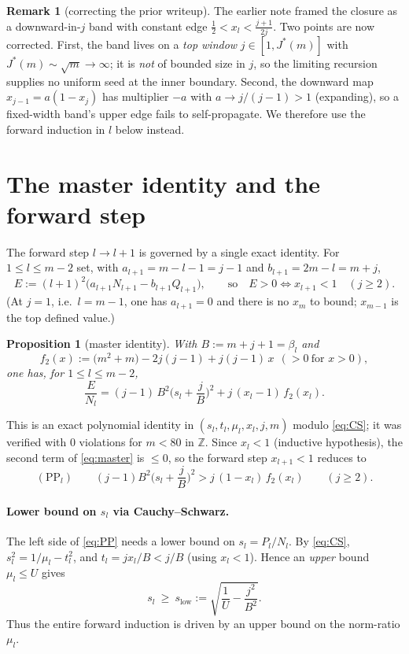 \documentclass[11pt]{article}
\newtheorem{proposition}{Proposition}
\theoremstyle{definition}
\newtheorem{remark}{Remark}
\newcommand{\Z}{\mathbb{Z}}
\begin{document}
\begin{remark}[correcting the prior writeup]
The earlier note framed the closure as a downward-in-$j$ band with
constant edge $\tfrac12<x_l<\tfrac{j+1}{2j}$.  Two points are now
corrected.  First, the band lives on a \emph{top window} $j\in[1,J^*(m)]$
with $J^*(m)\sim\sqrt m\to\infty$; it is \emph{not} of bounded size in
$j$, so the limiting recursion supplies no uniform seed at the inner
boundary.  Second, the downward map $x_{j-1}=a(1-x_j)$ has multiplier
$-a$ with $a\to j/(j-1)>1$ (expanding), so a fixed-width band's upper
edge fails to self-propagate.  We therefore use the forward induction in
$l$ below instead.
\end{remark}

\section{The master identity and the forward step}\label{sec:master}

The forward step $l\to l+1$ is governed by a single exact identity.  For
$1\le l\le m-2$ set, with $a_{l+1}=m-l-1=j-1$ and $b_{l+1}=2m-l=m+j$,
\[
  E:=(l+1)^2\big(a_{l+1}N_{l+1}-b_{l+1}Q_{l+1}\big),\qquad
  \text{so}\quad E>0\iff x_{l+1}<1\quad(j\ge2).
\]
(At $j=1$, i.e.\ $l=m-1$, one has $a_{l+1}=0$ and there is no $x_m$ to
bound; $x_{m-1}$ is the top defined value.)

\begin{proposition}[master identity]\label{prop:master}
With $B:=m+j+1=\beta_l$ and
\[
  f_2(x):=\big(m^2+m\big)-2j(j-1)+j(j-1)\,x\ \ (>0\ \text{for }x>0),
\]
one has, for $1\le l\le m-2$,
\begin{equation}\label{eq:master}
  \frac{E}{N_l}=(j-1)\,B^2\Big(s_l+\frac jB\Big)^2+j\,(x_l-1)\,f_2(x_l).
\end{equation}
\end{proposition}
\noindent This is an exact polynomial identity in $(s_l,t_l,\mu_l,x_l,j,m)$
modulo \eqref{eq:CS}; it was verified with $0$ violations for $m<80$ in
$\Z$.  Since $x_l<1$ (inductive hypothesis), the second term of
\eqref{eq:master} is $\le0$, so the forward step $x_{l+1}<1$ reduces to
\begin{equation}\label{eq:PP}
  (\mathrm{PP}_l)\qquad
  (j-1)B^2\Big(s_l+\frac jB\Big)^2 > j\,(1-x_l)\,f_2(x_l)\qquad(j\ge2).
\end{equation}

\paragraph{Lower bound on $s_l$ via Cauchy--Schwarz.}  The left side of
\eqref{eq:PP} needs a lower bound on $s_l=P_l/N_l$.  By \eqref{eq:CS},
$s_l^2=1/\mu_l-t_l^2$, and $t_l=jx_l/B<j/B$ (using $x_l<1$).  Hence an
\emph{upper} bound $\mu_l\le U$ gives
\begin{equation}\label{eq:slow}
  s_l\ \ge\ s_{\mathrm{low}}:=\sqrt{\frac1U-\frac{j^2}{B^2}} .
\end{equation}
Thus the entire forward induction is driven by an upper bound on the
norm-ratio $\mu_l$.
\end{document}
